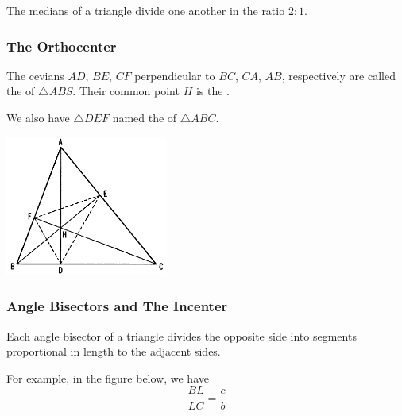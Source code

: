 \documentclass[DIV=12, a4]{scrartcl}
\begin{document}
\begin{theorem}
	The medians of a triangle divide one another in the ratio $2:1$.
\end{theorem}


\subsubsection{The Orthocenter}

\begin{definition}
	The cevians $AD$, $BE$, $CF$ perpendicular to $BC$, $CA$, $AB$, respectively are called the  of $\triangle ABS$. Their common point $H$ is the .
\end{definition}

We also have $\triangle DEF$ named the  of $\triangle ABC$. 

\begin{center}
		\includegraphics[width=0.4\textwidth]{media/1-3C}
\end{center}

\subsubsection{Angle Bisectors and The Incenter}


\begin{theorem}
	Each angle bisector of a triangle divides the opposite side into segments proportional in length to the adjacent sides.
\end{theorem}

For example, in the figure below, we have
$$
\frac{BL}{LC}= \frac{c}{b}
$$
\end{document}
